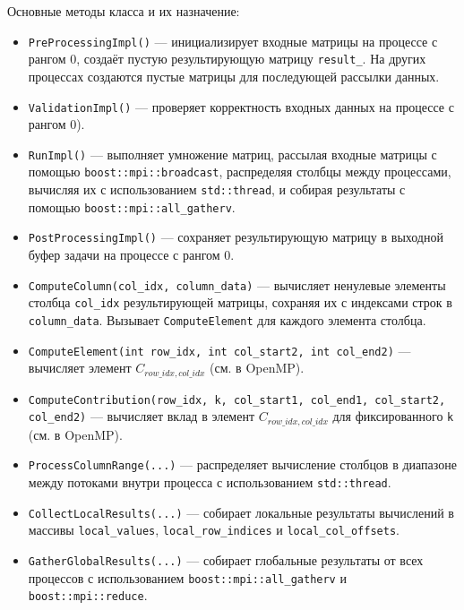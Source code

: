 \documentclass[12pt]{extarticle}
\begin{document}
Основные методы класса и их назначение:
\begin{itemize}
    \item \texttt{PreProcessingImpl()} — инициализирует входные матрицы на процессе с рангом 0, создаёт пустую результирующую матрицу \texttt{result\_}. На других процессах создаются пустые матрицы для последующей рассылки данных.
    \item \texttt{ValidationImpl()} — проверяет корректность входных данных на процессе с рангом 0).
    \item \texttt{RunImpl()} — выполняет умножение матриц, рассылая входные матрицы с помощью \texttt{boost::mpi::broadcast}, распределяя столбцы между процессами, вычисляя их с использованием \texttt{std::thread}, и собирая результаты с помощью \texttt{boost::mpi::all\_gatherv}.
    \item \texttt{PostProcessingImpl()} — сохраняет результирующую матрицу в выходной буфер задачи на процессе с рангом 0.
    \item \texttt{ComputeColumn(col\_idx, column\_data)} — вычисляет ненулевые элементы столбца \texttt{col\_idx} результирующей матрицы, сохраняя их с индексами строк в \texttt{column\_data}. Вызывает \texttt{ComputeElement} для каждого элемента столбца.
    \item \texttt{ComputeElement(int row\_idx, int col\_start2, int col\_end2)} — вычисляет элемент $C_{row\_idx, col\_idx}$ (см. в OpenMP).
    \item \texttt{ComputeContribution(row\_idx, k, col\_start1, col\_end1, col\_start2, col\_end2)} — вычисляет вклад в элемент  $C_{row\_idx, col\_idx}$  для фиксированного \texttt{k} (см. в OpenMP).
    \item \texttt{ProcessColumnRange(...)} — распределяет вычисление столбцов в диапазоне между потоками внутри процесса с использованием \texttt{std::thread}.
    \item \texttt{CollectLocalResults(...)} — собирает локальные результаты вычислений в массивы \texttt{local\_values}, \texttt{local\_row\_indices} и \texttt{local\_col\_offsets}.
    \item \texttt{GatherGlobalResults(...)} — собирает глобальные результаты от всех процессов с использованием \texttt{boost::mpi::all\_gatherv} и \texttt{boost::mpi::reduce}.
\end{itemize}
\end{document}
